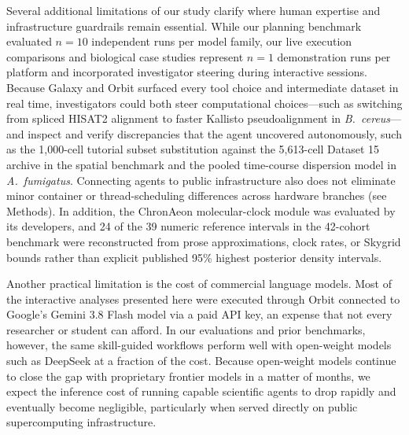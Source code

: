 \documentclass[11pt,letterpaper]{article}
\begin{document}
Several additional limitations of our study clarify where human expertise and infrastructure guardrails remain essential. While our planning benchmark evaluated $n = 10$ independent runs per model family, our live execution comparisons and biological case studies represent $n = 1$ demonstration runs per platform and incorporated investigator steering during interactive sessions. Because Galaxy and Orbit surfaced every tool choice and intermediate dataset in real time, investigators could both steer computational choices---such as switching from spliced HISAT2 alignment to faster Kallisto pseudoalignment in \textit{B.\ cereus}---and inspect and verify discrepancies that the agent uncovered autonomously, such as the 1,000-cell tutorial subset substitution against the 5,613-cell Dataset 15 archive in the spatial benchmark and the pooled time-course dispersion model in \textit{A.\ fumigatus}. Connecting agents to public infrastructure also does not eliminate minor container or thread-scheduling differences across hardware branches (see Methods). In addition, the ChronAeon molecular-clock module was evaluated by its developers, and 24 of the 39 numeric reference intervals in the 42-cohort benchmark were reconstructed from prose approximations, clock rates, or Skygrid bounds rather than explicit published 95\% highest posterior density intervals.

Another practical limitation is the cost of commercial language models. Most of the interactive analyses presented here were executed through Orbit connected to Google's Gemini 3.8 Flash model via a paid API key, an expense that not every researcher or student can afford. In our evaluations and prior benchmarks, however, the same skill-guided workflows perform well with open-weight models such as DeepSeek at a fraction of the cost. Because open-weight models continue to close the gap with proprietary frontier models in a matter of months, we expect the inference cost of running capable scientific agents to drop rapidly and eventually become negligible, particularly when served directly on public supercomputing infrastructure.
\end{document}
